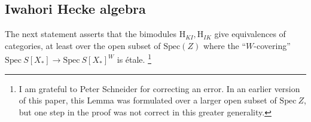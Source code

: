 \documentclass[10pt]{amsart}
\newcommand\mnote[1]{\marginpar{\tiny #1}}
\newcommand{\changecolor}{black}
\newcommand{\Spec}{\mathrm{Spec}}
\newcommand{\Z}{\mathbf{Z}}
\theoremstyle{remark}
\begin{document}
%   
% 
% 


\subsection{Iwahori Hecke algebra} \label{IwahoriHecke}
  
 {\color{\changecolor}  The next statement 
 asserts that the bimodules $\mathrm{H}_{KI}, \mathrm{H}_{IK}$ give
 equivalences of categories, at least over the open subset of $\Spec(Z)$
 where the ``$W$-covering'' $\Spec \ S[X_*] \rightarrow \Spec  \ S[X_*]^W$ is {\'e}tale. }
  \footnote{{\color{\changecolor} 
I am grateful to Peter Schneider for correcting an error. In an earlier version of this paper, this Lemma was formulated
over a larger open subset of $\Spec \ Z$, but one step in the proof was not correct in this greater generality.}}
     
\end{document}
